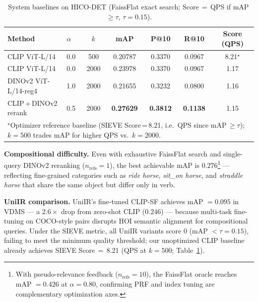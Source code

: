 \documentclass[sigconf, nonacm]{acmart}
\theoremstyle{definition}
\begin{document}
\begin{table}[t]
\centering
\caption{System baselines on HICO-DET (FaissFlat exact search; Score\,$=$\,QPS if mAP\,$\geq\tau$, $\tau{=}0.15$).}
\label{tab:baselines}
\vspace{3pt}
\footnotesize
\setlength{\tabcolsep}{4pt}
\begin{tabular}{p{3.6cm}lccccc}
\toprule
\textbf{Method} & \textbf{$\alpha$} & \textbf{$k$} & \textbf{mAP} & \textbf{P@10} & \textbf{R@10} & \textbf{Score (QPS)} \\
\midrule
\quad CLIP ViT-L/14                          & 0.0 & 500  & 0.20787 & 0.3370 & 0.0967 &  8.21$^\star$ \\
\quad CLIP ViT-L/14                          & 0.0 & 2000 & 0.23978 & 0.3370 & 0.0967 &  1.17 \\
\quad DINOv2 ViT-L/14-reg4                   & 1.0 & 2000 & 0.21655 & 0.3232 & 0.0800 &  1.16 \\
\quad CLIP\,+\,DINOv2 rerank                 & 0.5 & 2000 & \textbf{0.27629} & \textbf{0.3812} & \textbf{0.1138} & 1.15 \\
\midrule
\multicolumn{7}{l}{\footnotesize $^\star$Optimizer reference baseline (SIEVE Score\,=\,8.21, i.e.\ QPS since mAP\,$\geq\tau$); $k{=}500$ trades mAP for higher QPS vs.\ $k{=}2000$.} \\
\bottomrule
\end{tabular}
\end{table}

\noindent\textbf{Compositional difficulty.}
Even with exhaustive FaissFlat search and single-query DINOv2 reranking ($n_\text{refs}{=}1$),
the best achievable mAP is $0.276$\footnote{With pseudo-relevance feedback ($n_\text{refs}{=}10$),
the FaissFlat oracle reaches mAP $= 0.426$ at $\alpha{=}0.80$, confirming PRF and index
tuning are complementary optimization axes.} --- reflecting fine-grained categories such as
\textit{ride horse}, \textit{sit\_on horse}, and \textit{straddle horse} that share
the same object but differ only in verb.

\noindent\textbf{UniIR comparison.}
UniIR's fine-tuned CLIP-SF achieves mAP $= 0.095$ in VDMS --- a $2.6\times$ drop
from zero-shot CLIP ($0.246$) --- because multi-task fine-tuning on COCO-style pairs
disrupts HOI semantic alignment for compositional queries.
Under the SIEVE metric, all UniIR variants score $0$ (mAP $< \tau{=}0.15$),
failing to meet the minimum quality threshold; our unoptimized CLIP baseline
already achieves SIEVE Score\,$=$\,8.21 (QPS at $k{=}500$; Table~\ref{tab:baselines}).
\end{document}
